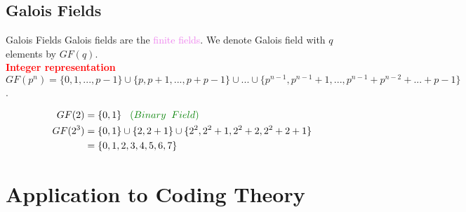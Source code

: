 \documentclass{beamer}
\begin{document}
\subsection{Galois Fields}
\begin{frame}{Galois Fields}
  Galois fields are the \textcolor{violet}{finite fields}. We denote Galois field with \(q\) elements by \(GF(q)\).\\[4mm]

\textcolor{red}{\textbf{Integer representation}}\\[2mm]
\(GF(p^n)=\{0,1,...,p-1\} \cup \{p,p+1,...,p+p-1\} \cup ... \cup \{p^{n-1},p^{n-1}+1,...,p^{n-1}+p^{n-2}+...+p-1\}\) \cite{galois}.
\vspace{5mm}

\begin{example}[Examples]
  \begin{align*}
    GF(2) &= \{0,1\} \hspace{3mm} \textcolor{green!50!black}{(Binary \;\; Field)}\\
    GF(2^3) &= \{0,1\} \cup \{2,2+1\} \cup \{2^2,2^2+1,2^2+2,2^2+2+1\}\\
            &= \{0,1,2,3,4,5,6,7\}
    \end{align*}
\end{example}
\end{frame}

\section{Application to Coding Theory}
\end{document}
